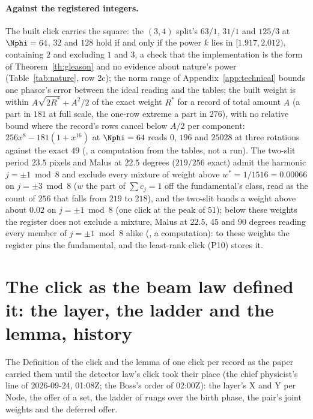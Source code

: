 \paragraph{Against the registered integers.} The built click carries the square: the $(3, 4)$ split's $63/1$, $31/1$ and $125/3$ at $\Nphi = 64$, $32$ and $128$ \cite[record 363]{log} hold if and only if the power $k$ lies in $[1.917, 2.012)$, containing $2$ and excluding $1$ and $3$, a check that the implementation is the form of Theorem~\ref{th:gleason} and no evidence about nature's power (Table~\ref{tab:nature}, row 2c); the norm range of Appendix~\ref{app:technical} bounds one phasor's error between the ideal reading and the tables; the built weight is within $A\sqrt{2R^*} + A^2/2$ of the exact weight $R^*$ for a record of total amount $A$ (a part in $181$ at full scale, the one-row extreme a part in $276$), with no relative bound where the record's rows cancel below $A/2$ per component: $256x^8 - 181(1 + x^{16})$ at $\Nphi = 64$ reads $0$, $196$ and $25028$ at three rotations against the exact $49$ (\cite{gleasonbound}, a computation from the tables, not a run). The two-slit period $23.5$ pixels and Malus at $22.5$ degrees ($219/256$ exact) admit the harmonic $j = \pm 1 \bmod 8$ and exclude every mixture of weight above $w^* = 1/1516 = 0.00066$ on $j = \pm 3 \bmod 8$ ($w$ the part of $\sum c_j = 1$ off the fundamental's class, read as the count of $256$ that falls from $219$ to $218$), and the two-slit bands a weight above about $0.02$ on $j = \pm 1 \bmod 8$ (one click at the peak of $51$); below these weights the register does not exclude a mixture, Malus at $22.5$, $45$ and $90$ degrees reading every member of $j = \pm 1 \bmod 8$ alike (\cite{gleasonbound}, a computation): to these weights the register pins the fundamental, and the least-rank click (P10) stores it.




\section{The click as the beam law defined it: the layer, the ladder and the lemma, history}\label{rec:oldclick}

The Definition of the click and the lemma of one click per record as the paper carried them until the detector law's click took their place (the chief physicist's line of 2026-09-24, 01:08Z; the Boss's order of 02:00Z): the layer's X and Y per Node, the offer of a set, the ladder of rungs over the birth phase, the pair's joint weights and the deferred offer.

